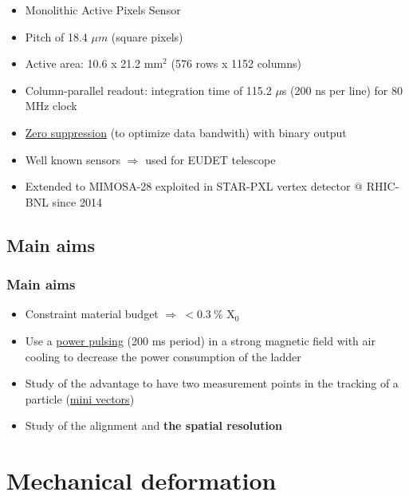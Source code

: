 \documentclass{beamer}
\newcommand{\grille}{
    \begin{tikzpicture}[overlay,remember picture]
        \begin{scope}[shift={(current page.south west)}]
            \draw[gray!50] (0,0) grid[step=2mm] (current page.north east);
            \draw[red!50] (0,0) grid[step=1cm] (current page.north east);
            \draw (0.2,1) node {1};
            \draw (0.2,2) node {2};
            \draw (0.2,3) node {3};
            \draw (0.2,4) node {4};
            \draw (0.2,5) node {5};
            \draw (0.2,6) node {6};
            \draw (0.2,7) node {7};
            \draw (0.2,8) node {8};
            \draw (0.2,9) node {9};
            \draw (1,0.5) node {1};
            \draw (2,0.5) node {2};
            \draw (3,0.5) node {3};
            \draw (4,0.5) node {4};
            \draw (5,0.5) node {5};
            \draw (6,0.5) node {6};
            \draw (7,0.5) node {7};
            \draw (8,0.5) node {8};
            \draw (9,0.5) node {9};
            \draw (10,0.5) node {10};
            \draw (11,0.5) node {11};
            \draw (12,0.5) node {12};
        \end{scope}
    \end{tikzpicture}
}
\begin{document}
\begin{frame}
  \scriptsize{
    \begin{itemize}
      \item Monolithic Active Pixels Sensor 
      \item Pitch of 18.4 $\mu m$ (square pixels)
      \item Active area: 10.6 x 21.2 mm$^2$ (576 rows x 1152 columns)
      \item Column-parallel readout: integration time of 115.2 $\mu$s (200 ns per line) for 80 MHz clock
      \item \hyperlink{suze}{Zero suppression} (to optimize data bandwith) with binary output
      \item Well known sensors $\Rightarrow$ used for EUDET telescope
      \item Extended to MIMOSA-28 exploited in STAR-PXL vertex detector @ RHIC-BNL since 2014
    \end{itemize}
  }
\end{frame}

\subsection{Main aims}

\begin{frame}
  \frametitle{Main aims}

  \begin{itemize}
    \item Constraint material budget $\Rightarrow~< 0.3~\%$ X$_0$
    \item Use a \hyperlink{powerPulsing}{power pulsing} (200 ms period) in a strong magnetic field with air cooling to decrease the power consumption of the ladder
    \item Study of the advantage to have two measurement points in the tracking of a particle (\hyperlink{miniVec}{mini vectors}) 
    \item Study of the alignment and \textbf{the spatial resolution}
  \end{itemize}
\end{frame}

  \section{Mechanical deformation}
  
\end{document}
